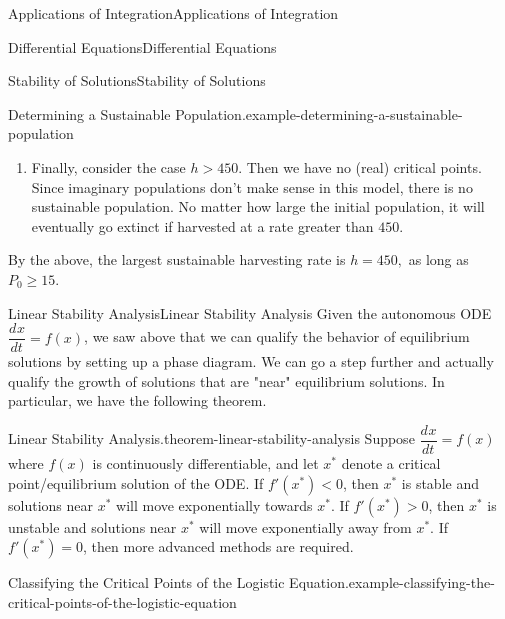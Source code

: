 \documentclass[10pt,]{book}
\newcommand{\terminology}[1]{\textbf{#1}}
\numberwithin{equation}{section}
\newcommand{\dv}[3][]{\dfrac{d^{#1} #2}{d #3^{#1}}}
\newcommand{\lt}{<}
\newcommand{\gt}{>}
\begin{document}
\begin{chapterptx}{Applications of Integration}{}{Applications of Integration}{}{}
\begin{sectionptx}{Differential Equations}{}{Differential Equations}{}{}
\begin{subsectionptx}{Stability of Solutions}{}{Stability of Solutions}{}{}
\begin{example}{Determining a Sustainable Population.}{example-determining-a-sustainable-population}
\begin{enumerate}
\begin{figure}
{
}
\end{figure}
\hypertarget{p-766}{}%
We interpret the phase diagram as follows: if \(P\) is less than \hypertarget{p-767}{}%
15,000%
 then the population will collapse to extinction. Otherwise, the population will stabilize at \(15,000\). This type of critical point is often called \terminology{semi-stable.}%
\item\hypertarget{li-67}{}\hypertarget{p-768}{}%
Finally, consider the case \(h \gt 450\). Then we have no (real) critical points. Since imaginary populations don't make sense in this model, there is no sustainable population. No matter how large the initial population, it will eventually go extinct if harvested at a rate greater than \(450\).%
\end{enumerate}
\hypertarget{p-769}{}%
By the above, the largest sustainable harvesting rate is \(h = 450,\) as long as \(P_{0}\geq 15\).%
\end{example}
\end{subsectionptx}
%
%
\typeout{************************************************}
\typeout{************************************************}
%
\begin{subsectionptx}{Linear Stability Analysis}{}{Linear Stability Analysis}{}{}\label{subsection-linear-stability-analysis}
\hypertarget{p-770}{}%
Given the autonomous ODE \(\dv{x}{t} = f(x)\), we saw above that we can qualify the behavior of equilibrium solutions by setting up a phase diagram. We can go a step further and actually qualify the growth of solutions that are "near" equilibrium solutions. In particular, we have the following theorem.%
\begin{theorem}{Linear Stability Analysis.}{}{theorem-linear-stability-analysis}%
\hypertarget{p-771}{}%
Suppose \(\dv{x}{t} = f(x)\) where \(f(x)\) is continuously differentiable, and let \(x^{*}\) denote a critical point/equilibrium solution of the ODE. If \(f'(x^{*}) \lt 0\), then \(x^{*}\) is stable and solutions near \(x^{*}\) will move exponentially towards \(x^{*}\). If \(f'(x^{*}) \gt 0\), then \(x^{*}\) is unstable and solutions near \(x^{*}\) will move exponentially away from \(x^{*}\). If \(f'(x^{*}) = 0\), then more advanced methods are required.%
\end{theorem}
\begin{example}{Classifying the Critical Points of the Logistic Equation.}{example-classifying-the-critical-points-of-the-logistic-equation}%

\end{example}
\end{subsectionptx}
\end{sectionptx}
\end{chapterptx}
\end{document}
